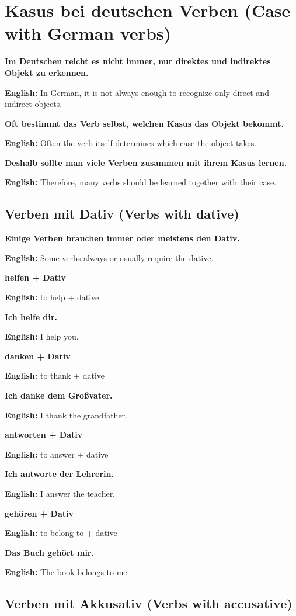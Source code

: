 \documentclass[a4paper,11pt]{article}
\newcommand{\EnglishText}[1]{{\small\color{SoftGray}\textbf{English: }#1\par}}
\newcommand{\EN}[1]{\EnglishText{#1}}
\begin{document}
    \section{Kasus bei deutschen Verben \textnormal{(Case with German verbs)}}
        
        \textbf{Im Deutschen reicht es nicht immer, nur direktes und indirektes Objekt zu erkennen.}
        \EN{In German, it is not always enough to recognize only direct and indirect objects.}
        
        \textbf{Oft bestimmt das Verb selbst, welchen Kasus das Objekt bekommt.}
        \EN{Often the verb itself determines which case the object takes.}
        
        \textbf{Deshalb sollte man viele Verben zusammen mit ihrem Kasus lernen.}
        \EN{Therefore, many verbs should be learned together with their case.}
        
        \subsection{Verben mit Dativ \textnormal{(Verbs with dative)}}
            
            \textbf{Einige Verben brauchen immer oder meistens den Dativ.}
            \EN{Some verbs always or usually require the dative.}
            
            \textbf{helfen + Dativ}
            \EN{to help + dative}
            
            \textbf{Ich helfe dir.}
            \EN{I help you.}
            
            \textbf{danken + Dativ}
            \EN{to thank + dative}
            
            \textbf{Ich danke dem Großvater.}
            \EN{I thank the grandfather.}
            
            \textbf{antworten + Dativ}
            \EN{to answer + dative}
            
            \textbf{Ich antworte der Lehrerin.}
            \EN{I answer the teacher.}
            
            \textbf{gehören + Dativ}
            \EN{to belong to + dative}
            
            \textbf{Das Buch gehört mir.}
            \EN{The book belongs to me.}
        
        \subsection{Verben mit Akkusativ \textnormal{(Verbs with accusative)}}
            
\end{document}
